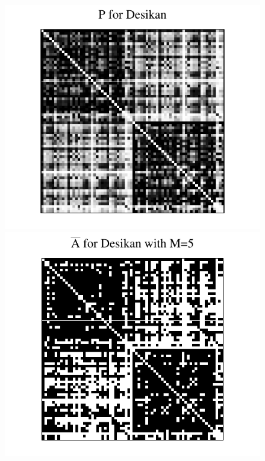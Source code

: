 \documentclass[simplex.tex]{subfiles}
\begin{document}
\begin{figure}[!h]
\begin{cframed}
\centering
\includegraphics[height=.2\textheight]{../../figs/P_desikan.pdf} \hspace{-35pt}
\includegraphics[height=.201\textheight]{../../figs/Abar_desikan_m1.pdf} \hspace{-35pt}

\end{cframed}
\end{figure}
\end{document}
